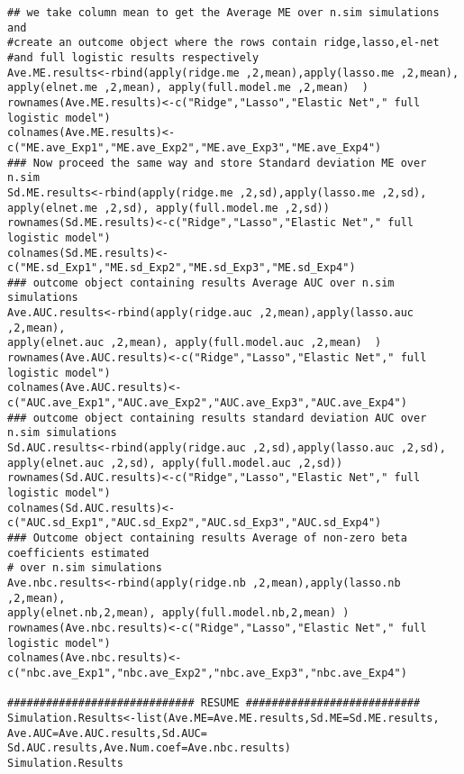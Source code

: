 \documentclass[12pt]{report}
\begin{document}
\begin{lstlisting}
## we take column mean to get the Average ME over n.sim simulations and
#create an outcome object where the rows contain ridge,lasso,el-net
#and full logistic results respectively
Ave.ME.results<-rbind(apply(ridge.me ,2,mean),apply(lasso.me ,2,mean),
apply(elnet.me ,2,mean), apply(full.model.me ,2,mean)  )
rownames(Ave.ME.results)<-c("Ridge","Lasso","Elastic Net"," full logistic model")
colnames(Ave.ME.results)<-c("ME.ave_Exp1","ME.ave_Exp2","ME.ave_Exp3","ME.ave_Exp4")
### Now proceed the same way and store Standard deviation ME over n.sim
Sd.ME.results<-rbind(apply(ridge.me ,2,sd),apply(lasso.me ,2,sd),
apply(elnet.me ,2,sd), apply(full.model.me ,2,sd))
rownames(Sd.ME.results)<-c("Ridge","Lasso","Elastic Net"," full logistic model")
colnames(Sd.ME.results)<-c("ME.sd_Exp1","ME.sd_Exp2","ME.sd_Exp3","ME.sd_Exp4")
### outcome object containing results Average AUC over n.sim simulations
Ave.AUC.results<-rbind(apply(ridge.auc ,2,mean),apply(lasso.auc ,2,mean),
apply(elnet.auc ,2,mean), apply(full.model.auc ,2,mean)  )
rownames(Ave.AUC.results)<-c("Ridge","Lasso","Elastic Net"," full logistic model")
colnames(Ave.AUC.results)<-c("AUC.ave_Exp1","AUC.ave_Exp2","AUC.ave_Exp3","AUC.ave_Exp4")
### outcome object containing results standard deviation AUC over n.sim simulations
Sd.AUC.results<-rbind(apply(ridge.auc ,2,sd),apply(lasso.auc ,2,sd),
apply(elnet.auc ,2,sd), apply(full.model.auc ,2,sd))
rownames(Sd.AUC.results)<-c("Ridge","Lasso","Elastic Net"," full logistic model")
colnames(Sd.AUC.results)<-c("AUC.sd_Exp1","AUC.sd_Exp2","AUC.sd_Exp3","AUC.sd_Exp4")
### Outcome object containing results Average of non-zero beta coefficients estimated 
# over n.sim simulations
Ave.nbc.results<-rbind(apply(ridge.nb ,2,mean),apply(lasso.nb ,2,mean),
apply(elnet.nb,2,mean), apply(full.model.nb,2,mean) )
rownames(Ave.nbc.results)<-c("Ridge","Lasso","Elastic Net"," full logistic model")
colnames(Ave.nbc.results)<-c("nbc.ave_Exp1","nbc.ave_Exp2","nbc.ave_Exp3","nbc.ave_Exp4")

############################# RESUME ###########################
Simulation.Results<-list(Ave.ME=Ave.ME.results,Sd.ME=Sd.ME.results,
Ave.AUC=Ave.AUC.results,Sd.AUC= Sd.AUC.results,Ave.Num.coef=Ave.nbc.results)
Simulation.Results
\end{lstlisting}
\end{document}
